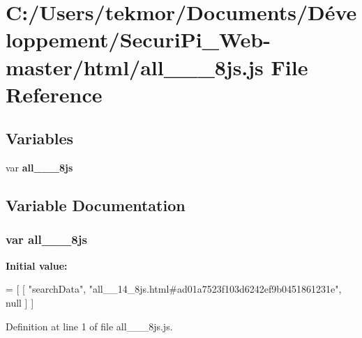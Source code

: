 \section{C\+:/\+Users/tekmor/\+Documents/\+Développement/\+Securi\+Pi\+\_\+\+Web-\/master/html/all\+\_\+\+\_\+\_\+8js.js File Reference}
\label{all____14__8js_8js}
\subsection*{Variables}
\begin{DoxyCompactItemize}
\item 
var {\bf all\+\_\+\+\_\+\_\+8js}
\end{DoxyCompactItemize}


\subsection{Variable Documentation}
\subsubsection[{all\+\_\+\+\_\+14\+\_\+8js}]{\setlength{\rightskip}{0pt plus 5cm}var all\+\_\+\+\_\+\_\+8js}\label{all____14__8js_8js_adf767a759a7989ea72c3fb8b883d619b}
{\bfseries Initial value\+:}
\begin{DoxyCode}
=
[
    [ \textcolor{stringliteral}{"searchData"}, \textcolor{stringliteral}{"all\_\_14\_8js.html#ad01a7523f103d6242ef9b0451861231e"}, null ]
]
\end{DoxyCode}


Definition at line 1 of file all\+\_\+\+\_\+\_\+8js.\+js.

